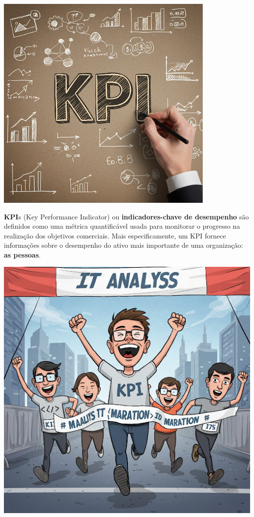 \documentclass[
]{book}
\begin{document}
\includegraphics[width=4.23958in,height=\textheight]{images/cobit/07-0-kpi.jpg}

\textbf{KPI}s (Key Performance Indicator) ou \textbf{indicadores-chave de desempenho} são definidos como uma métrica quantificável usada para monitorar o progresso na realização dos objetivos comerciais. Mais especificamente, um KPI fornece informações sobre o desempenho do ativo mais importante de uma organização: \textbf{as pessoas}.

\includegraphics{images/cobit/07-kpi.jpg}
\end{document}

